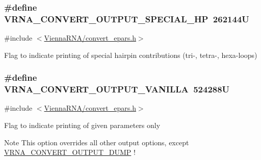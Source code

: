 \subsubsection[{V\+R\+N\+A\+\_\+\+C\+O\+N\+V\+E\+R\+T\+\_\+\+O\+U\+T\+P\+U\+T\+\_\+\+S\+P\+E\+C\+I\+A\+L\+\_\+\+H\+P}]{\setlength{\rightskip}{0pt plus 5cm}\#define V\+R\+N\+A\+\_\+\+C\+O\+N\+V\+E\+R\+T\+\_\+\+O\+U\+T\+P\+U\+T\+\_\+\+S\+P\+E\+C\+I\+A\+L\+\_\+\+H\+P~262144\+U}\label{group__energy__parameters__convert_gaa1ff48a79642d69579d1766561ec6db6}


{\ttfamily \#include $<$\hyperlink{convert__epars_8h}{Vienna\+R\+N\+A/convert\+\_\+epars.\+h}$>$}

Flag to indicate printing of special hairpin contributions (tri-\/, tetra-\/, hexa-\/loops) \hypertarget{group__energy__parameters__convert_ga0d4e8a836bb4864ab5129c085dbf592d}{}
\subsubsection[{V\+R\+N\+A\+\_\+\+C\+O\+N\+V\+E\+R\+T\+\_\+\+O\+U\+T\+P\+U\+T\+\_\+\+V\+A\+N\+I\+L\+L\+A}]{\setlength{\rightskip}{0pt plus 5cm}\#define V\+R\+N\+A\+\_\+\+C\+O\+N\+V\+E\+R\+T\+\_\+\+O\+U\+T\+P\+U\+T\+\_\+\+V\+A\+N\+I\+L\+L\+A~524288\+U}\label{group__energy__parameters__convert_ga0d4e8a836bb4864ab5129c085dbf592d}


{\ttfamily \#include $<$\hyperlink{convert__epars_8h}{Vienna\+R\+N\+A/convert\+\_\+epars.\+h}$>$}

Flag to indicate printing of given parameters only~\newline
\begin{DoxyNote}{Note}
This option overrides all other output options, except \hyperlink{group__energy__parameters__convert_gac86976e9c2a55b3a6481ea60044f6098}{V\+R\+N\+A\+\_\+\+C\+O\+N\+V\+E\+R\+T\+\_\+\+O\+U\+T\+P\+U\+T\+\_\+\+D\+U\+M\+P} ! 
\end{DoxyNote}
\hypertarget{group__energy__parameters__convert_ga2eb0462f16939ddacdaf751a88d675ce}{}
